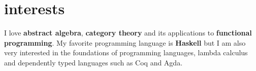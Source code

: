 \documentclass[]{friggeri-cv-a4}
\begin{document}
\section{interests}
I love \textbf{abstract algebra}, \textbf{category theory} and its applications to \textbf{functional
programming}. My favorite programming language is \textbf{Haskell} but I am also very interested in
the foundations of programming languages, lambda calculus and dependently typed languages such
as Coq and Agda.
\end{document}
